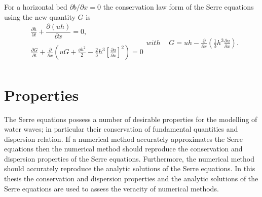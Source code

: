 For a horizontal bed $\partial b / \partial x = 0$ the conservation law form of the Serre equations using the new quantity $G$ is
\begin{subequations}
	\label{eqn:FullSerreConHorizBed}
	\begin{align}
	&\frac{\partial h}{\partial t} + \dfrac{\partial (uh)}{\partial x} = 0, \label{eqn:FullSerreConMassHorizBed} \\  \nonumber \\
	&\frac{\partial G}{\partial t}   + \frac{\partial}{\partial x} \left( {u} G + \frac{gh^2}{2} - \frac{2}{3}h^3 \left[\frac{\partial {u}}{\partial x}\right]^2 \right) = 0 \label{eqn:SerreconsconmomHorizBed}\\ \nonumber 
	\end{align}
	with
	\begin{align}
	&G =  {u}h  - \frac{\partial}{\partial x}\left(\frac{1}{3}h^3  \frac{\partial {u}}{\partial x}\right). \label{defn:SerreEqnConservedQuantity1HorizBed}
	\end{align}
\end{subequations}


\section{Properties}
The Serre equations possess a number of desirable properties for the modelling of water waves; in particular their conservation of fundamental quantities and dispersion relation. If a numerical method accurately approximates the Serre equations then the numerical method should reproduce the conservation and dispersion properties of the Serre equations. Furthermore, the numerical method should accurately reproduce the analytic solutions of the Serre equations. In this thesis the conservation and dispersion properties and the analytic solutions of the Serre equations are used to assess the veracity of numerical methods. 

%

